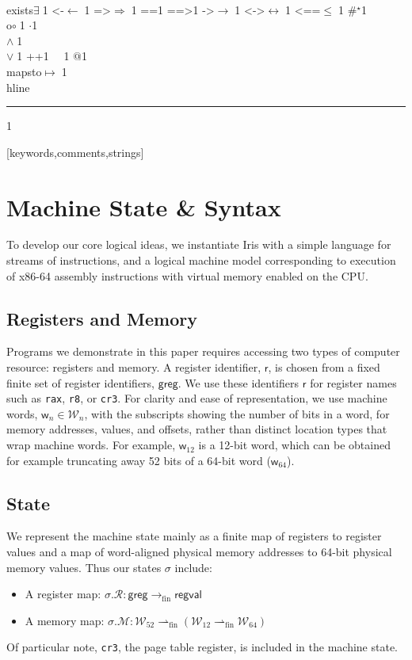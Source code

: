 \documentclass[acmsmall,screen,nonacm]{acmart}
\newcommand{\kw}[1]{\mathsf{#1}}
\newcommand{\Loctw}{\mathcal{W}_{12}}
\newcommand{\Locsf}{\mathcal{W}_{64}}
\newcommand{\Locft}{\mathcal{W}_{52}}
\newcommand{\Loc}{\mathcal{W}_n}
\newcommand{\loc}{\kw{w}_n}
\newcommand{\regset}{\kw{greg}}
\newcommand{\reg}{\kw{r}}
\begin{document}
{    {\\exists}{{$\exists\;$}}1
    {<-}{{$\leftarrow\;$}}1
    {=>}{{$\Rightarrow\;$}}1
    {==}{{\code{==}\;}}1
    {==>}{{\code{==>}\;}}1
    {->}{{$\rightarrow\;$}}1
    {<->}{{$\leftrightarrow\;$}}1
    {<==}{{$\leq\;$}}1
    {\#}{{$^\star$}}1 
    {\\o}{{$\circ\;$}}1 
    {\@}{{$\cdot$}}1 
    {\/\\}{{$\wedge\;$}}1
    {\\\/}{{$\vee\;$}}1
    {++}{{\code{++}}}1
    {~}{{\ }}1
    {\@\@}{{$@$}}1
    {\\mapsto}{{$\mapsto\;$}}1
    {\\hline}{{\rule{\linewidth}{0.5pt}}}1
}[keywords,comments,strings]

\section{Machine State \& Syntax}
\label{sec:syntax}
To develop our core logical ideas, we instantiate \textsf{Iris} with a simple language for streams of instructions, 
and a logical machine model corresponding to execution of x86-64 assembly instructions with virtual memory enabled on the 
CPU.

\subsection{Registers and Memory}
Programs we demonstrate in this paper requires accessing two types of computer resource: registers and memory.
A register identifier, $\reg$, is chosen from a fixed finite set of register identifiers, $\regset$. 
We use these identifiers $\reg$ for register names such as \texttt{rax}, \texttt{r8}, or \texttt{cr3}.
%
%
%
%
%
%
%
%
%
%
%
%
%
%
%
%
%
%
%
%
%
%
%
%
%
%
%
%
%
%
%
%
%
%
%
%
%
%
%
%
%
%
For clarity and ease of representation, we use machine words, $\loc \in \Loc$, with the subscripts showing the number of bits in a word,
for memory addresses, values, and offsets, rather than distinct location types that wrap machine words.
For example, $\kw{w}_{12}$ is a 12-bit word, which can be obtained for example truncating away 52 bits of a 64-bit word ($\kw{w}_{64}$).
\subsection{State}
\label{sec:state}
We represent the machine state mainly as a finite map of registers to register values and a map of word-aligned physical memory addresses 
to 64-bit physical memory values. 
Thus our states $\sigma$ include:
%
\begin{itemize}
%
\item A register map: $\sigma.\mathcal{R}: \kw{greg} \rightarrow_{\textrm{fin}} \kw{regval} $
\item A memory map: $\sigma.\mathcal{M}: \Locft \rightharpoonup_{\textrm{fin}} (\Loctw \rightharpoonup_{\textrm{fin}} \Locsf )$
\end{itemize}
Of particular note, \texttt{cr3}, the page table register, is included in the machine state.
%
\end{document}

